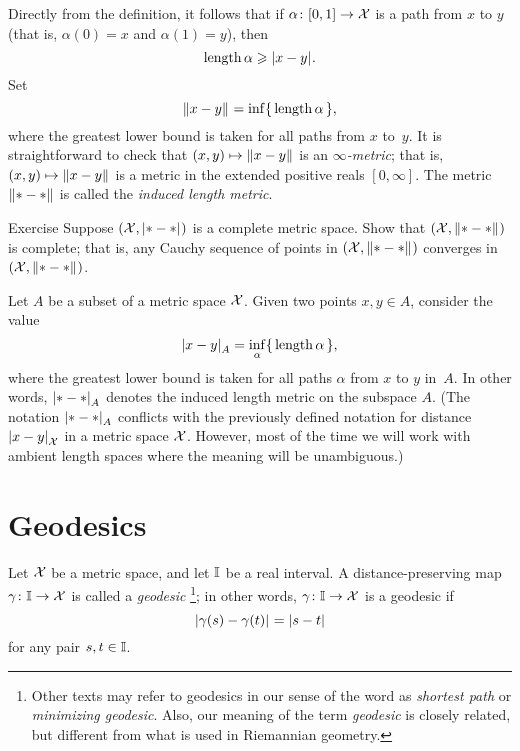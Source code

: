 Directly from the definition, it follows that if $\alpha\colon[0,1]\to\mathcal{X}$ is a path from $x$ to $y$ 
(that is, $\alpha(0)=x$ and $\alpha(1)=y$), then 
\[\mathop{\rm length}\nolimits\alpha\geqslant |{x}-{y}|_{}^{{}}.\]
Set 
\[\|{x}-{y}\|_{}^{{}}=\inf\{\,\mathop{\rm length}\nolimits\alpha\,\},\]
where the greatest lower bound is taken for all paths from $x$ to~$y$.
It is straightforward to check that $(x,y)\mapsto \|{x}-{y}\|_{}^{{}}$ is an \emph{$\infty$-metric};
that is, $(x,y)\mapsto \|{x}-{y}\|_{}^{{}}$ is a metric in the extended positive reals $[0,\infty]$. 
The metric $\|{*}-{*}\|_{}^{{}}$ is called the \emph{induced length metric}.

\begin{thm}{Exercise}\label{ex:compact=>complete}
Suppose $(\mathcal{X},|{*}-{*}|_{}^{{}})$ is a complete metric space.
Show that $(\mathcal{X},\|{*}-{*}\|_{}^{{}})$ is complete;
that is, any Cauchy sequence of points in $(\mathcal{X},\|{*}-{*}\|_{}^{{}})$ converges in $(\mathcal{X},\|{*}-{*}\|_{}^{{}})$.
\end{thm}

Let $A$ be a subset of a metric space $\mathcal{X}$.
Given two points $x,y\in A$,
consider the value
\[|{x}-{y}|_{A}^{{}}=\inf_{\alpha}\{\,\mathop{\rm length}\nolimits\alpha\,\},
\]
where the greatest lower bound is taken for all paths $\alpha$ from $x$ to $y$ in~$A$.
In other words, $|{*}-{*}|_{A}^{{}}$ denotes the induced length metric on the subspace $A$.
(The notation $|{*}-{*}|_{A}^{{}}$ conflicts with the previously defined notation for distance $|{x}-{y}|_{\mathcal{X}}^{{}}$ in a metric space $\mathcal{X}$.
However, most of the time we will work with ambient length spaces where the meaning will be unambiguous.)

\section{Geodesics}

Let $\mathcal{X}$ be a metric space,
and let $\mathbb{I}$ be a real interval.
A distance-preserving map $\gamma\colon\mathbb{I}\to \mathcal{X}$ is called a \emph{geodesic}%
\footnote{Other texts  may refer to geodesics in our sense of the word as  \textit{shortest path} or \textit{minimizing geodesic}.
Also, our meaning of the term \textit{geodesic} is closely related, but different from what is used in Riemannian geometry.};
in other words, $\gamma\colon\mathbb{I}\to \mathcal{X}$ is a geodesic if 
\[|{\gamma(s)}-{\gamma(t)}|_{}^{{}}=|s-t|\]
for any pair $s,t\in \mathbb{I}$.

